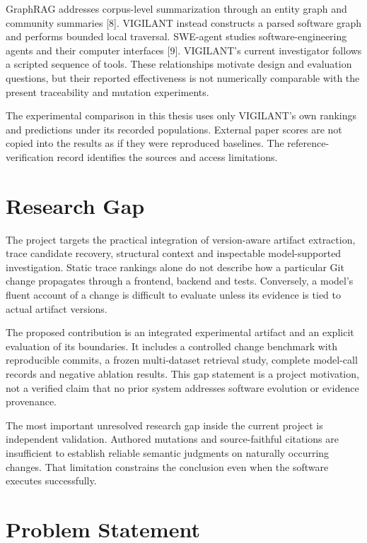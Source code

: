 \documentclass[
  11pt,
  a4paper,
]{report}
\begin{document}
GraphRAG addresses corpus-level summarization through an entity graph
and community summaries {[}8{]}. VIGILANT instead constructs a parsed
software graph and performs bounded local traversal. SWE-agent studies
software-engineering agents and their computer interfaces {[}9{]}.
VIGILANT's current investigator follows a scripted sequence of tools.
These relationships motivate design and evaluation questions, but their
reported effectiveness is not numerically comparable with the present
traceability and mutation experiments.

The experimental comparison in this thesis uses only VIGILANT's own
rankings and predictions under its recorded populations. External paper
scores are not copied into the results as if they were reproduced
baselines. The reference-verification record identifies the sources and
access limitations.

\hypertarget{research-gap}{%
\chapter{Research Gap}\label{research-gap}}

The project targets the practical integration of version-aware artifact
extraction, trace candidate recovery, structural context and inspectable
model-supported investigation. Static trace rankings alone do not
describe how a particular Git change propagates through a frontend,
backend and tests. Conversely, a model's fluent account of a change is
difficult to evaluate unless its evidence is tied to actual artifact
versions.

The proposed contribution is an integrated experimental artifact and an
explicit evaluation of its boundaries. It includes a controlled change
benchmark with reproducible commits, a frozen multi-dataset retrieval
study, complete model-call records and negative ablation results. This
gap statement is a project motivation, not a verified claim that no
prior system addresses software evolution or evidence provenance.

The most important unresolved research gap inside the current project is
independent validation. Authored mutations and source-faithful citations
are insufficient to establish reliable semantic judgments on naturally
occurring changes. That limitation constrains the conclusion even when
the software executes successfully.

\hypertarget{problem-statement}{%
\chapter{Problem Statement}\label{problem-statement}}
\end{document}
